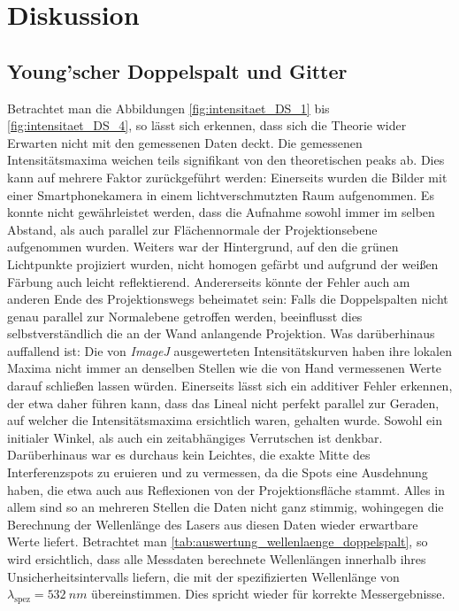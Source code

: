 \documentclass[ngerman]{scrartcl}
\begin{document}
\section{Diskussion}
\label{sec:diskussion}

\subsection{Young'scher Doppelspalt und Gitter}
\label{subsec:diskussion_doppelspalt_gitter_gitter}

Betrachtet man die Abbildungen \ref{fig:intensitaet_DS_1} bis \ref{fig:intensitaet_DS_4}, so lässt sich erkennen, dass sich die Theorie wider Erwarten nicht mit den gemessenen Daten deckt. Die gemessenen Intensitätsmaxima weichen teils signifikant von den theoretischen peaks ab. Dies kann auf mehrere Faktor zurückgeführt werden: Einerseits wurden die Bilder mit einer Smartphonekamera in einem lichtverschmutzten Raum aufgenommen. Es konnte nicht gewährleistet werden, dass die Aufnahme sowohl immer im selben Abstand, als auch parallel zur Flächennormale der Projektionsebene aufgenommen wurden. Weiters war der Hintergrund, auf den die grünen Lichtpunkte projiziert wurden, nicht homogen gefärbt und aufgrund der weißen Färbung auch leicht reflektierend. Andererseits könnte der Fehler auch am anderen Ende des Projektionswegs beheimatet sein: Falls die Doppelspalten nicht genau parallel zur Normalebene getroffen werden, beeinflusst dies selbstverständlich die an der Wand anlangende Projektion. Was darüberhinaus auffallend ist: Die von \textit{ImageJ} ausgewerteten Intensitätskurven haben ihre lokalen Maxima nicht immer an denselben Stellen wie die von Hand vermessenen Werte darauf schließen lassen würden. Einerseits lässt sich ein additiver Fehler erkennen, der etwa daher führen kann, dass das Lineal nicht perfekt parallel zur Geraden, auf welcher die Intensitätsmaxima ersichtlich waren, gehalten wurde. Sowohl ein initialer Winkel, als auch ein zeitabhängiges Verrutschen ist denkbar. Darüberhinaus war es durchaus kein Leichtes, die exakte Mitte des Interferenzspots zu eruieren und zu vermessen, da die Spots eine Ausdehnung haben, die etwa auch aus Reflexionen von der Projektionsfläche stammt. Alles in allem sind so an mehreren Stellen die Daten nicht ganz stimmig, wohingegen die Berechnung der Wellenlänge des Lasers aus diesen Daten wieder erwartbare Werte liefert. Betrachtet man \autoref{tab:auswertung_wellenlaenge_doppelspalt}, so wird ersichtlich, dass alle Messdaten berechnete Wellenlängen innerhalb ihres Unsicherheitsintervalls liefern, die mit der spezifizierten Wellenlänge von $\lambda_{\text{spez}}=\SI{532}{nm}$ übereinstimmen. Dies spricht wieder für korrekte Messergebnisse.
\end{document}
